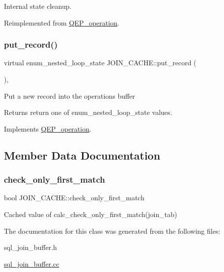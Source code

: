 Internal state cleanup. 

Reimplemented from \mbox{\hyperlink{classQEP__operation_a5a3acf4022e1369ca5eadef33f61ac80}{Q\+E\+P\+\_\+operation}}.

\mbox{\label{classJOIN__CACHE_a28c138049387c559d0ea74d7a6fbcfc0}} 
\subsubsection{\texorpdfstring{put\+\_\+record()}{put\_record()}}
{\footnotesize\ttfamily virtual enum\+\_\+nested\+\_\+loop\+\_\+state J\+O\+I\+N\+\_\+\+C\+A\+C\+H\+E\+::put\+\_\+record (\begin{DoxyParamCaption}{ }\end{DoxyParamCaption})\hspace{0.3cm}{\ttfamily [inline]}, {\ttfamily [virtual]}}

Put a new record into the operation\textquotesingle{}s buffer \begin{DoxyReturn}{Returns}
return one of enum\+\_\+nested\+\_\+loop\+\_\+state values. 
\end{DoxyReturn}


Implements \mbox{\hyperlink{classQEP__operation_af7cac289b2b1a38349cc27e8a4ff7597}{Q\+E\+P\+\_\+operation}}.



\subsection{Member Data Documentation}
\mbox{\label{classJOIN__CACHE_a552c01e2652d83a8ef05a712e0f6b96c}} 
\subsubsection{\texorpdfstring{check\+\_\+only\+\_\+first\+\_\+match}{check\_only\_first\_match}}
{\footnotesize\ttfamily bool J\+O\+I\+N\+\_\+\+C\+A\+C\+H\+E\+::check\+\_\+only\+\_\+first\+\_\+match\hspace{0.3cm}{\ttfamily [protected]}}

Cached value of calc\+\_\+check\+\_\+only\+\_\+first\+\_\+match(join\+\_\+tab) 

The documentation for this class was generated from the following files\+:\begin{DoxyCompactItemize}
\item 
sql\+\_\+join\+\_\+buffer.\+h\item 
\mbox{\hyperlink{sql__join__buffer_8cc}{sql\+\_\+join\+\_\+buffer.\+cc}}\end{DoxyCompactItemize}
